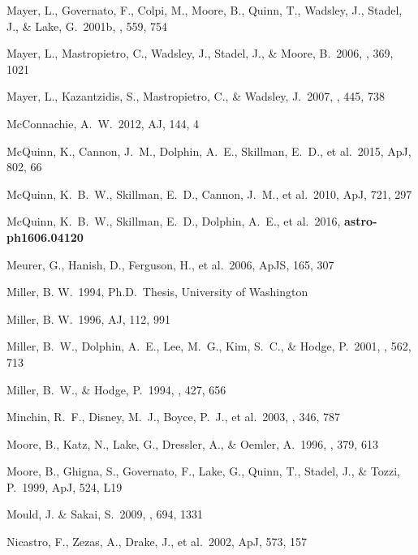 \documentclass[12pt,onecolumn]{emulateapj}
\begin{document}
\begin{thebibliography}{}
Mayer, L., Governato, F., Colpi, M., Moore, B., Quinn, T., Wadsley, J., 
Stadel, J., \& Lake, G.\ 2001b, \apj, 559, 754 

Mayer, L., Mastropietro, C., Wadsley, J., Stadel, J., \& Moore, B.\ 2006, \mnras, 369, 1021

Mayer, L., Kazantzidis, S., Mastropietro, C., \& Wadsley, J.\ 2007, \nat, 445, 738 

McConnachie, A.~W.\ 2012, AJ, 144, 4 

McQuinn, K., Cannon, J.~M., Dolphin, A.~E., Skillman, E.~D., et al.\ 2015, ApJ, 802, 66 

McQuinn, K.~B.~W., Skillman, E.~D., Cannon, J.~M., et al.\ 2010, ApJ, 721, 297

McQuinn, K.~B.~W., Skillman, E.~D., Dolphin, A.~E., et al.\ 2016, {\bf astro-ph1606.04120}

Meurer, G., Hanish, D., Ferguson, H., et al.\ 2006, ApJS, 165, 307 

Miller, B. W.\ 1994, Ph.D.\ Thesis, University of Washington

Miller, B. W.\ 1996, AJ, 112, 991 

Miller, B.~W., Dolphin, A.~E., Lee, M.~G., Kim, S.~C., \& Hodge, P.\ 2001, \apj , 562, 713

Miller, B.~W., \& Hodge, P.\ 1994, \apj , 427, 656

Minchin, R.~F.,  Disney, M.~J., Boyce, P.~J., et al.\ 2003, \mnras, 346, 787 

Moore, B., Katz, N., Lake, G., Dressler, A., \& Oemler, A.\ 1996, \nat, 379, 613 

Moore, B., Ghigna, S., Governato, F., Lake, G., Quinn, T., Stadel, J., \&
Tozzi, P.\ 1999, ApJ, 524, L19

Mould, J. \& Sakai, S.\ 2009, \apj, 694, 1331

Nicastro, F., Zezas, A., Drake, J., et al.\ 2002, ApJ, 573, 157


\end{thebibliography}
\end{document}
